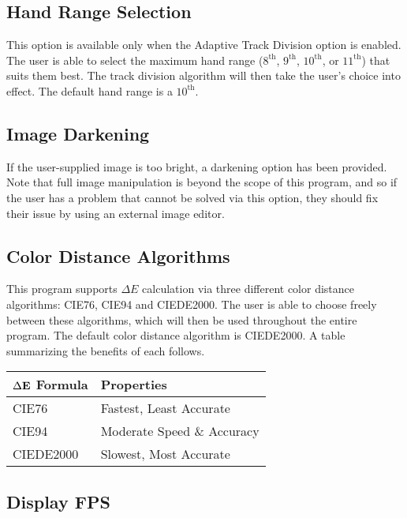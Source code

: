 \documentclass[english]{article}
\makeatletter
\newenvironment{restoretext}%
    {\@parboxrestore%
     \begin{adjustwidth}{}{\leftmargin}%
    }{\end{adjustwidth}
     }
\def\rcbegin{\begin{restoretext}\centering}
\def\rcend{\end{restoretext}}
\makeatother
\begin{document}
\subsection{Hand Range Selection}

This option is available only when the Adaptive Track Division option is enabled. The user is able to select the 
maximum hand range ($8^\text{th}$, $9^\text{th}$, $10^\text{th}$, or $11^\text{th}$) that suits them best. The 
track division algorithm will then take the user's choice into effect. The default hand range is a $10^\text{th}$.

\subsection{Image Darkening}

If the user-supplied image is too bright, a darkening option has been provided. Note that full image manipulation is
beyond the scope of this program, and so if the user has a problem that cannot be solved via this option, they
should fix their issue by using an external image editor.

\subsection{Color Distance Algorithms}

This program supports $\Delta E$ calculation via three different color distance algorithms: CIE76, CIE94 and CIEDE2000.
The user is able to choose freely between these algorithms, which will then be used throughout the entire program. The
default color distance algorithm is CIEDE2000. A table summarizing the benefits of each follows.

\vspace{1em}

\rcbegin
\begin{tabular}{|l|l|}
  \hline
  $\Delta\bf{E}$\textbf{ Formula}   & \textbf{Properties} \\
  \hline
  CIE76                             & Fastest, Least Accurate\\
  CIE94                             & Moderate Speed \& Accuracy\\
  CIEDE2000                         & Slowest, Most Accurate\\
  \hline
\end{tabular}
\rcend

\vspace{1em}

\subsection{Display FPS}
\end{document}
